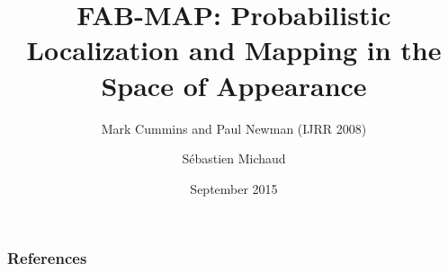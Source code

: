 \documentclass[[aspectratio=169,14pt,t]{beamer}
\title[FAB-MAP]{FAB-MAP: Probabilistic Localization and Mapping in the Space of Appearance}
\subtitle{Mark Cummins and Paul Newman (IJRR 2008)}
\author{Sébastien Michaud}
\institute{Laval University}
\date{September 2015}
\begin{document}
\begin{frame}
    \titlepage
\end{frame}



%



\begin{frame}[allowframebreaks]
    \frametitle{References}
    \def\newblock{\hskip .11em plus .33em minus .07em} %
    \small
    \nocite{*}
    
    
\end{frame}
\end{document}
